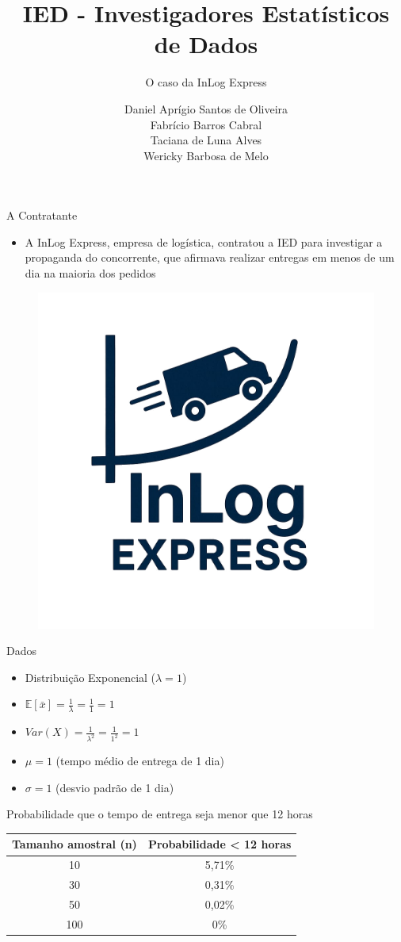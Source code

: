 \documentclass[aspectratio=169,14pt]{beamer}
\title{IED - Investigadores Estatísticos de Dados}
\subtitle{O caso da InLog Express}
\author{
    Daniel Aprígio Santos de Oliveira \\
    Fabrício Barros Cabral \\
    Taciana de Luna Alves \\
    Wericky Barbosa de Melo
}
\date{}
\begin{document}
\titlepage

\begin{frame}{A Contratante}
    \begin{itemize}
        \item A InLog Express, empresa de logística, contratou a IED para
        investigar a propaganda do concorrente, que afirmava realizar entregas
        em menos de um dia na maioria dos pedidos
    \end{itemize}
    \begin{figure}
        \centering
        \includegraphics[width=0.4\linewidth]{inlog.png}
    \end{figure}
\end{frame}

\begin{frame}{Dados}
    \begin{itemize}
        \item Distribuição Exponencial ($\lambda = 1$)
        \item $\mathbb{E}[\bar{x}] = \frac{1}{\lambda} = \frac{1}{1} = 1$
        \item $Var(X) = \frac{1}{\lambda^2} = \frac{1}{1^2} = 1$
        \item $\mu = 1$ (tempo médio de entrega de 1 dia)
        \item $\sigma = 1$ (desvio padrão de 1 dia)
    \end{itemize}
\end{frame}

\begin{frame}{Probabilidade que o tempo de entrega seja menor que 12 horas}
    \begin{table}[]
        \begin{tabular}{|c|c|}
        \hline
        \textbf{Tamanho amostral (n)} & \textbf{Probabilidade < 12 horas} \\ \hline
        10                            & 5,71\% \\ \hline
        30                            & 0,31\% \\ \hline
        50                            & 0,02\% \\ \hline
        100                           & 0\%    \\ \hline
        \end{tabular}
    \end{table}
\end{frame}
\end{document}
